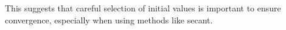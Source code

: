 \documentclass[a4paper]{article}
\begin{document}
This suggests that careful selection of initial values is important to ensure convergence, especially when using methods like secant.

\subsection*{  }
\printbibliography
\end{document}
